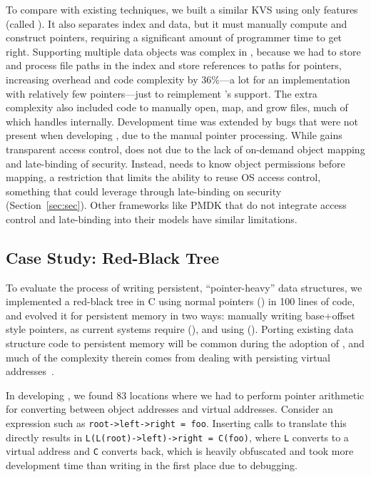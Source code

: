 To compare with existing techniques, we built a
similar KVS using only \unix features (called \unixkv). It also separates index and data, but it
must manually compute and construct pointers, requiring a significant amount of programmer time to
get right.
Supporting multiple data objects was complex in \unixkv, because we had to store and process file
paths in the index and store references to paths for pointers, increasing overhead and code
complexity by 36\%---a lot for an implementation with relatively few pointers---just to reimplement
\Twizzler's support. The extra complexity also included code to manually open, map, and
grow files, much of which \Twizzler handles internally. Development time was extended by
bugs that were not present when developing \nvkv, due to the manual pointer processing.  While \nvkv
gains transparent access control, \unixkv does not due to the lack of
on-demand object mapping and late-binding of security. Instead, \unixkv needs to know object permissions before
mapping,
a restriction that limits the ability to reuse OS access control, something that
\nvkv could leverage through late-binding on security (Section~\ref{sec:sec}). Other frameworks like PMDK
that do not integrate access control and late-binding into their models have similar
limitations.


\subsection{Case Study: Red-Black Tree}
To evaluate the process of writing persistent, ``pointer-heavy'' data
structures,
we implemented a red-black tree in C using normal pointers (\ramrbt)
in 100 lines of code,
and evolved it for persistent memory in two ways: manually writing
base+offset style pointers, as current systems require (\unixrbt),
and using \Twizzler (\nvrbt).
Porting existing data structure code to persistent memory
will be common during the adoption of \NVM, and much of the complexity therein
comes from dealing with persisting virtual addresses~\cite{virendra:hotstorage17}.

In developing \unixrbt, we found 83 locations where we had to perform pointer arithmetic for
converting between object addresses and virtual addresses.  Consider an expression such as
\texttt{root->left->right = foo}. Inserting calls to translate this directly results in
\texttt{L(L(root)->left)->right = C(foo)}, where \texttt{L} converts to a virtual address and
\texttt{C} converts back, which is heavily obfuscated and took more development time than writing
\ramrbt in the first place due to debugging.

